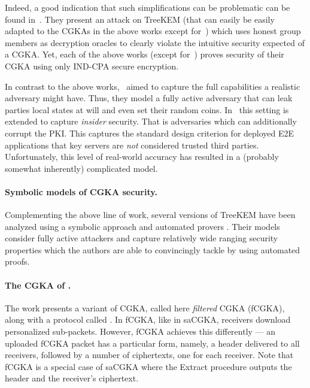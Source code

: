 Indeed, a good indication that such simplifications can be problematic can be
found in~\cite{EPRINT:AlwJosMul20}. They present an attack on TreeKEM
(that can easily be easily adapted to the CGKAs in the above works except
for~\cite{Eprint:BCK21}) which uses honest group members as decryption oracles
to clearly violate the intuitive security expected of a CGKA. Yet, each of
the above works (except for~\cite{Eprint:BCK21}) proves security of their
CGKA using only IND-CPA secure encryption.

In contrast to the above works,~\cite{TCC:ACJM20} aimed to capture the full
capabilities a realistic adversary might have. Thus, they model a fully
active adversary that can leak parties local states at will and even set
their random coins. In~\cite{EPRINT:AlwJosMul20} this setting is extended to
capture \emph{insider} security. That is adversaries which can additionally
corrupt the PKI. This captures the standard design criterion for deployed E2E
applications that key servers are \emph{not} considered trusted third
parties. Unfortunately, this level of real-world accuracy has resulted in a
(probably somewhat inherently) complicated model.

\paragraph{Symbolic models of CGKA security.}
Complementing the above line of work, several versions of TreeKEM have been
analyzed using a symbolic approach and automated provers
\cite{bhargavan:hal-02425229}. Their models consider fully active attackers
and capture relatively wide ranging security properties which the authors are
able to convincingly tackle by using automated proofs.

\paragraph{The CGKA of \cite{hashimoto2021cmpke}.}
The work \cite{hashimoto2021cmpke} presents a variant of CGKA, called here \emph{filtered} CGKA (fCGKA), along with a protocol called \protCMPKE.
%
In fCGKA, like in saCGKA, receivers download personalized sub-packets. However, fCGKA achieves this differently --- an uploaded fCGKA packet has a particular form, namely, a header delivered to all receivers, followed by a number of ciphertexts, one for each receiver. Note that fCGKA is a special case of saCGKA where the Extract procedure outputs the header and the receiver's ciphertext.

